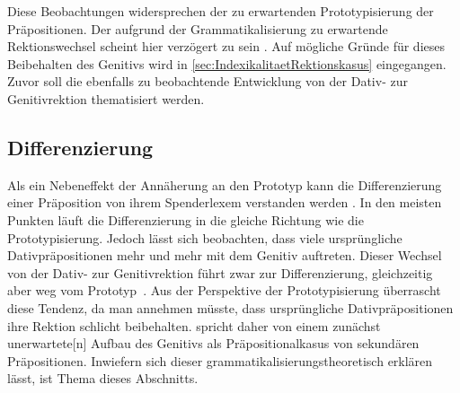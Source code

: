 Diese Beobachtungen widersprechen der zu erwartenden Prototypisierung der Präpositionen. 
Der aufgrund der Grammatikalisierung zu erwartende Rektionswechsel scheint hier verzögert zu sein \citep[s. auch][218--219]{DiMeola2003}. 
Auf mögliche Gründe für dieses Beibehalten des Genitivs wird in \autoref{sec:IndexikalitaetRektionskasus} eingegangen. 
Zuvor soll die ebenfalls zu beobachtende Entwicklung von der Dativ- zur Genitivrektion thematisiert werden. 
\subsection{Differenzierung}
\label{sec:Differenzierung}
Als ein Nebeneffekt der Annäherung an den Prototyp kann die Differenzierung einer Präposition von ihrem Spenderlexem verstanden werden \citep[s.][160--161]{DiMeola2000}.
In den meisten Punkten läuft die Differenzierung in die gleiche Richtung wie die Prototypisierung. 
Jedoch lässt sich beobachten, dass viele ursprüngliche Dativpräpositionen mehr und mehr mit dem Genitiv auftreten. 
Dieser Wechsel von der Dativ- zur Genitivrektion f{\"u}hrt zwar zur Differenzierung, gleichzeitig aber weg vom Prototyp~\citep[s.][162]{DiMeola2000}.
Aus der Perspektive der Prototypisierung überrascht diese Tendenz, da man annehmen müsste, dass ursprüngliche Dativpräpositionen ihre Rektion schlicht beibehalten. 
\citet[33]{Szczepaniak2014} spricht daher von einem zunächst {\glqq}unerwartete[n] Aufbau des Genitivs als Pr{\"a}positionalkasus von sekund{\"a}ren Pr{\"a}positionen{\grqq}. 
Inwiefern sich dieser grammatikalisierungstheoretisch erklären lässt, ist Thema dieses Abschnitts. 


